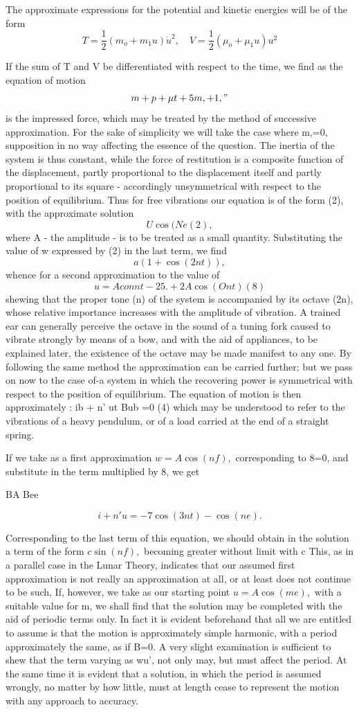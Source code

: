 The approximate expressions for the potential and kinetic energies will be of the form
\[
T= \frac{1}{2} (m_o + m_1 u) \dot{u}^2, \quad V = \frac{1}{2} (\mu_o + \mu_1 u) u^2
\]

If the sum of T and V be differentiated with respect to the time, we find as
the equation of motion
\[m + p + \mu t + 5m, +  1,"\]
is the impressed force, which
may be treated by the method of successive approximation. For the sake of
simplicity we will take the case where m,=0, supposition in no way affecting
the essence of the question. The inertia of the system is thus constant, while
the force of restitution is a composite function of the displacement, partly
proportional to the displacement itself and partly proportional to its square -
accordingly unsymmetrical with respect to the position of equilibrium. Thus for
free vibrations our equation is of the form (2), with the approximate solution
\[U \cos(Ne (2),\]
where A - the amplitude - is to be treated as a small
quantity. Substituting the value of w expressed by (2) in the last term, we
find
\[a (1 + \cos(2 n t)),\]
whence for a second approximation to the value of
\[u= A c o n n t - 25. + 2A \cos(Ont) (8)\]
shewing that the proper tone (n) of
the system is accompanied by its octave (2n), whose relative importance
increases with the amplitude of vibration. A trained ear can generally perceive
the octave in the sound of a tuning fork caused to vibrate strongly by means of
a bow, and with the aid of appliances, to be explained later, the existence of
the octave may be made manifest to any one. By following the same method the
approximation can be carried further; but we pass on now to the case of-a
system in which the recovering power is symmetrical with respect to the
position of equilibrium. The equation of motion is then approximately : ib + n'
ut Bub =0 (4) which may be understood to refer to the vibrations of a heavy
pendulum, or of a load carried at the end of a straight spring.

If we take as a first approximation \(w= A \cos(nf),\) corresponding to 8=0,
and substitute in the term multiplied by 8, we get

BA Bee

\[i+ n'u=- 7 \cos(3nt) - \cos(ne).\]

Corresponding to the last term of this equation, we should obtain in the
solution a term of the form \(c \sin(nf),\) becoming greater without limit with
c This, as in a parallel case in the Lunar Theory, indicates that our assumed
first approximation is not really an approximation at all, or at least does not
continue to be such, If, however, we take as our starting point \(u =A
\cos(me),\) with a suitable value for m, we shall find that the solution may be
completed with the aid of periodic terms only. In fact it is evident beforehand
that all we are entitled to assume is that the motion is approximately simple
harmonic, with a period approximately the same, as if B=0. A very slight
examination is sufficient to shew that the term varying as wu', not only may,
but must affect the period. At the same time it is evident that a solution, in
which the period is assumed wrongly, no matter by how little, must at length
cease to represent the motion with any approach to accuracy.

